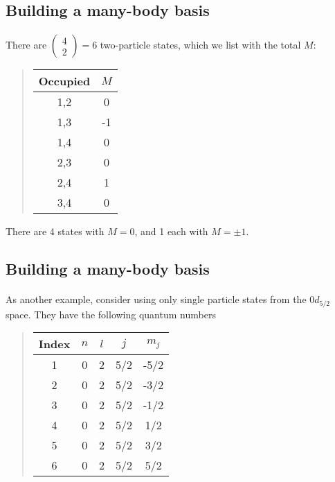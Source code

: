 \documentclass[%
oneside,                 %
final,                   %
10pt]{article}
\begin{document}
\subsection*{Building a many-body basis}

\paragraph{}
There are $\left ( \begin{array}{c} 4 \\ 2 \end{array} \right) = 6$ two-particle states, 
which we list with the total $M$:


\begin{quote}
\begin{tabular}{cc}
\hline
\multicolumn{1}{c}{ Occupied } & \multicolumn{1}{c}{ $M$ } \\
\hline
1,2      & 0   \\
1,3      & -1  \\
1,4      & 0   \\
2,3      & 0   \\
2,4      & 1   \\
3,4      & 0   \\
\hline
\end{tabular}
\end{quote}

\noindent
There are 4 states with $M= 0$, 
and 1 each with $M = \pm 1$.



\subsection*{Building a many-body basis}

\paragraph{}
As another example, consider using only single particle states from the $0d_{5/2}$ space. 
They have the following quantum numbers


\begin{quote}
\begin{tabular}{ccccc}
\hline
\multicolumn{1}{c}{ Index } & \multicolumn{1}{c}{ $n$ } & \multicolumn{1}{c}{ $l$ } & \multicolumn{1}{c}{ $j$ } & \multicolumn{1}{c}{ $m_j$ } \\
\hline
1     & 0   & 2   & 5/2 & -5/2  \\
2     & 0   & 2   & 5/2 & -3/2  \\
3     & 0   & 2   & 5/2 & -1/2  \\
4     & 0   & 2   & 5/2 & 1/2   \\
5     & 0   & 2   & 5/2 & 3/2   \\
6     & 0   & 2   & 5/2 & 5/2   \\
\hline
\end{tabular}
\end{quote}
\end{document}
